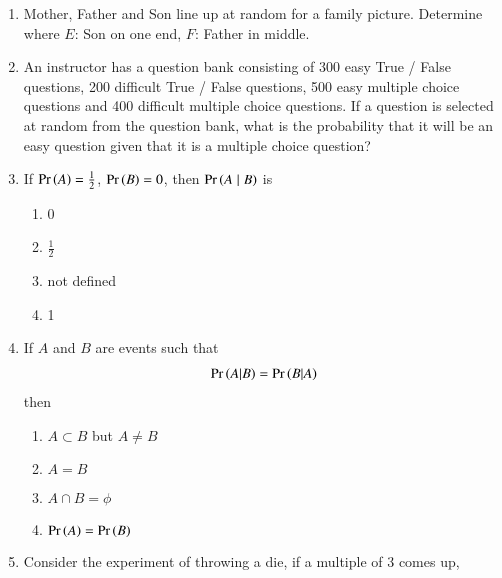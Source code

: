 \begin{enumerate}[label=\thesubsection.\arabic*,ref=\thesubsection.\theenumi]
		\begin{multicols}{3}
\begin{enumerate}
	\item $\pr{AB}$   
	\item $\pr{A \mid B}$
	\item $\pr{B \mid A}$
\end{enumerate}
\end{multicols}
\solution
		
\item Mother, Father and Son line up at random for a family picture. Determine  where 
$E$: Son on one end, $F$: Father in middle.
\\
\solution
		
	\item An instructor has a question bank consisting of 300 easy True / False questions,
200 difficult True / False questions, 500 easy multiple choice questions and 400
difficult multiple choice questions. If a question is selected at random from the
question bank, what is the probability that it will be an easy question given that it
is a multiple choice question?
\\
\solution
		
\item If $ \Pr\left(A\right)  = \frac{1}{2}$, $\Pr\left(B\right) = 0$, then $\pr{A \mid B}$ is
	\begin{multicols}{4}
\begin{enumerate}
\item 0
\item $\frac{1}{2}$
\item not defined
\item 1
\end{enumerate}
\end{multicols}
 \item If $A$ and $B$ are events such that 
    \begin{align}
        \pr{A|B} = \pr{B|A}
        \label{eq:ncert/12/13/1/17/cond}
    \end{align} 
    then 
    \begin{enumerate}
        \item $A \subset B$ but $A \neq B$
        \item $A = B$ 
        \item $A \cap B = \phi$ 
        \item $\Pr\left(A\right) = \Pr\left(B\right)$
    \end{enumerate}
    \solution
%
 \item Consider the experiment of throwing a die, if a multiple of 3 comes up, 

\end{enumerate}

